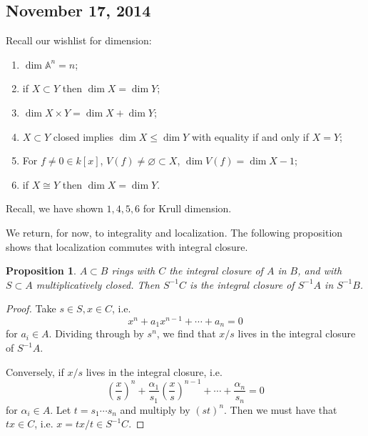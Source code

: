 \documentclass{article}
\newcommand{\A}{\mathbb{A}}
\theoremstyle{plain}
\newtheorem{prop}[thm]{Proposition}
\theoremstyle{definition}
\theoremstyle{remark}
\begin{document}
\subsection*{November 17, 2014}

Recall our wishlist for dimension:
\begin{enumerate}
    \item $\dim \A^n=n$;
    \item if $X\subset Y$ then $\dim X=\dim Y$;
    \item $\dim X\times Y=\dim X+\dim Y$;
    \item $X\subset Y$ closed implies $\dim X\leq\dim Y$ with equality if and only if $X=Y$;
    \item For $f\neq0\in k[x]$, $V(f)\neq\varnothing\subset X$, $\dim V(f)=\dim X-1$;
    \item if $X\cong Y$ then $\dim X=\dim Y$.
\end{enumerate}
Recall, we have shown $1,4,5,6$ for Krull dimension.

We return, for now, to integrality and localization. The following proposition
shows that localization commutes with integral closure.

\begin{prop}
    $A\subset B$ rings with $C$ the integral closure of $A$ in $B$, and with $S\subset A$ multiplicatively
    closed. Then $S^{-1}C$ is the integral closure of $S^{-1}A$ in $S^{-1}B$.
\end{prop}

\begin{proof}
    Take $s\in S,x\in C$, i.e.
    \[x^n+a_1x^{n-1}+\cdots+a_n=0\]
    for $a_i\in A$.  Dividing through by $s^{n}$, we find that $x/s$ lives in the integral
    closure of $S^{-1}A$.

    Conversely, if $x/s$ lives in the integral closure, i.e.
    \[\left(\frac{x}{s}\right)^n+\frac{\alpha_1}{s_1}\left( \frac{x}{s} \right)^{n-1}+\cdots+\frac{\alpha_n}{s_n}=0\]
    for $\alpha_i\in A$. Let $t=s_1\cdots s_n$ and multiply by $(st)^n$. Then we must have that $tx\in C$,
    i.e. $x=tx/t\in S^{-1}C$.
\end{proof}
\end{document}
